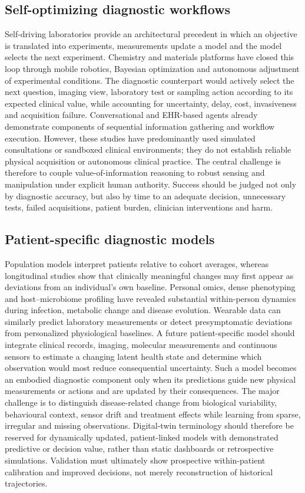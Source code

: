 \documentclass[12pt,a4paper]{article}
\begin{document}
\subsection{Self-optimizing diagnostic workflows}
\label{subsec:self_optimizing_diagnostic_workflows}
Self-driving laboratories provide an architectural precedent in which an objective is translated into experiments, measurements update a model and the model selects the next experiment. Chemistry and materials platforms have closed this loop through mobile robotics, Bayesian optimization and autonomous adjustment of experimental conditions. The diagnostic counterpart would actively select the next question, imaging view, laboratory test or sampling action according to its expected clinical value, while accounting for uncertainty, delay, cost, invasiveness and acquisition failure. Conversational and EHR-based agents already demonstrate components of sequential information gathering and workflow execution. However, these studies have predominantly used simulated consultations or sandboxed clinical environments; they do not establish reliable physical acquisition or autonomous clinical practice. The central challenge is therefore to couple value-of-information reasoning to robust sensing and manipulation under explicit human authority. Success should be judged not only by diagnostic accuracy, but also by time to an adequate decision, unnecessary tests, failed acquisitions, patient burden, clinician interventions and harm.


\subsection{Patient-specific diagnostic models}
\label{subsec:patient_specific_embodied_models}
Population models interpret patients relative to cohort averages, whereas longitudinal studies show that clinically meaningful changes may first appear as deviations from an individual's own baseline. Personal omics, dense phenotyping and host--microbiome profiling have revealed substantial within-person dynamics during infection, metabolic change and disease evolution. Wearable data can similarly predict laboratory measurements or detect presymptomatic deviations from personalized physiological baselines. A future patient-specific model should integrate clinical records, imaging, molecular measurements and continuous sensors to estimate a changing latent health state and determine which observation would most reduce consequential uncertainty. Such a model becomes an embodied diagnostic component only when its predictions guide new physical measurements or actions and are updated by their consequences. The major challenge is to distinguish disease-related change from biological variability, behavioural context, sensor drift and treatment effects while learning from sparse, irregular and missing observations. Digital-twin terminology should therefore be reserved for dynamically updated, patient-linked models with demonstrated predictive or decision value, rather than static dashboards or retrospective simulations. Validation must ultimately show prospective within-patient calibration and improved decisions, not merely reconstruction of historical trajectories.
\end{document}
